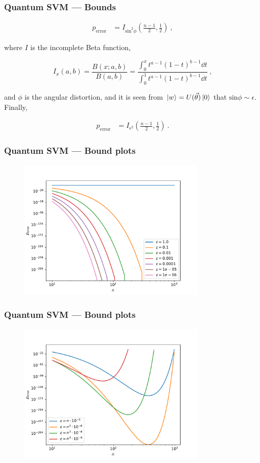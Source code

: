 \begin{frame}
    \frametitle{Quantum SVM --- Bounds}
    \begin{align}
        p_{\text{error}}&= I_{\text{sin}^2\phi}(\frac{n-1}{2}, \frac{1}{2})~,
    \end{align}

    where \(I\) is the incomplete Beta function, 

    \begin{equation}
        I_x(a, b) = \frac{B(x; a, b)}{B(a, b)} = \frac{\int_0^x t^{a-1} (1-t)^{b-1} \dd t}{\int_0^1 t^{a-1} (1-t)^{b-1} \dd t}~,
    \end{equation}

    and \(\phi\) is the angular distortion, and it is seen from \(\ket*{w} =
    U(\vec{\theta})\ket*{0}\) that \(\text{sin} \phi \sim \epsilon\). Finally,

    \begin{align}
        p_{\text{error}}&= I_{\epsilon^2}(\frac{n-1}{2}, \frac{1}{2})~.
    \end{align}

\end{frame}

\begin{frame}
    \frametitle{Quantum SVM --- Bound plots}

    \begin{figure}
        \includegraphics[width=0.8\textwidth]{figures/perrorplot.pdf}
    \end{figure}

\end{frame}

\begin{frame}
    \frametitle{Quantum SVM --- Bound plots}

    \begin{figure}
        \includegraphics[width=0.8\textwidth]{figures/perrorscaled.pdf}
    \end{figure}

\end{frame}